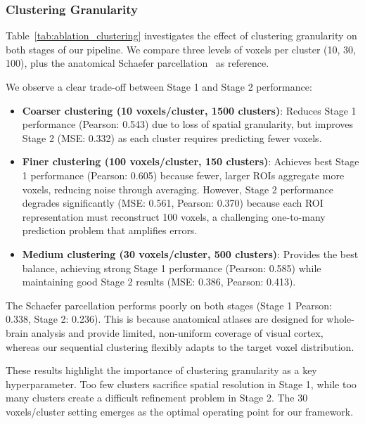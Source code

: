 \subsubsection{Clustering Granularity}

Table~\ref{tab:ablation_clustering} investigates the effect of clustering granularity
on both stages of our pipeline.
We compare three levels of voxels per cluster (10, 30, 100),
plus the anatomical Schaefer parcellation~\cite{schaefer2018local} as reference.

We observe a clear trade-off between Stage 1 and Stage 2 performance:
\begin{itemize}
  \item \textbf{Coarser clustering (10 voxels/cluster, 1500 clusters)}:
        Reduces Stage 1 performance (Pearson: 0.543) due to loss of spatial granularity,
        but improves Stage 2 (MSE: 0.332) as each cluster requires predicting fewer voxels.

  \item \textbf{Finer clustering (100 voxels/cluster, 150 clusters)}:
        Achieves best Stage 1 performance (Pearson: 0.605) because fewer, larger ROIs
        aggregate more voxels, reducing noise through averaging.
        However, Stage 2 performance degrades significantly (MSE: 0.561, Pearson: 0.370)
        because each ROI representation must reconstruct 100 voxels,
        a challenging one-to-many prediction problem that amplifies errors.

  \item \textbf{Medium clustering (30 voxels/cluster, 500 clusters)}:
        Provides the best balance, achieving strong Stage 1 performance (Pearson: 0.585)
        while maintaining good Stage 2 results (MSE: 0.386, Pearson: 0.413).
\end{itemize}

The Schaefer parcellation performs poorly on both stages (Stage 1 Pearson: 0.338, Stage 2: 0.236).
This is because anatomical atlases are designed for whole-brain analysis
and provide limited, non-uniform coverage of visual cortex,
whereas our sequential clustering flexibly adapts to the target voxel distribution.

These results highlight the importance of clustering granularity as a key hyperparameter.
Too few clusters sacrifice spatial resolution in Stage 1,
while too many clusters create a difficult refinement problem in Stage 2.
The 30 voxels/cluster setting emerges as the optimal operating point for our framework.

